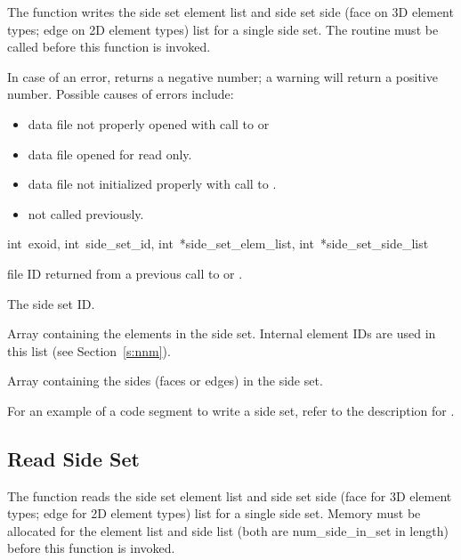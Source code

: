 The function  writes the side set element
list and side set side (face on 3D element types; edge on 2D element
types) list for a single side set. The routine
 must be called before this function
is invoked.

In case of an error,  returns a negative
number; a warning will return a positive number.  Possible causes of
errors include:

\begin{itemize}
 \item data file not properly opened with call to 
or 

 \item data file opened for read only.

 \item data file not initialized properly with call to .

 \item {} not called previously.
\end{itemize}

{int~exoid,
int~side_set_id,
int~*side_set_elem_list,
int~*side_set_side_list}

\begin{parameters}
\item[int exoid \R{}]
\exo{} file ID returned from a previous call to 
or .

\item[{int side_set_id \R{}}]
The side set ID.

\item[int* side_set_elem_list \R{}]
Array containing the elements in the side set. Internal element
IDs are used in this list (see  Section~\ref{s:nnm}).

\item[int* side_set_side_list \R{}]
Array containing the sides (faces or edges) in the side set.
\end{parameters}

For an example of a code segment to write a side set, refer
to the description for .

\subsection{Read Side Set}

The function  reads the side set element
list and side set side (face for 3D element types; edge for 2D
element types) list for a single side set. Memory must be allocated
for the element list and side list (both are {num_side_in_set} in
length) before this function is invoked.


